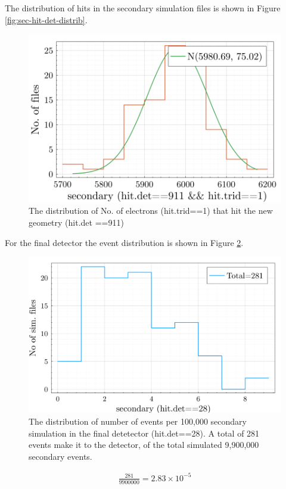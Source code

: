 \documentclass[a4paper,12pt]{article}
\begin{document}
The distribution of hits in the secondary simulation files is shown in Figure \ref{fig:sec-hit-det-distrib}.

\begin{figure}[h!]
    \centering
    \includegraphics[width=1\linewidth]{image/helicoil-20221121-113016-img-secondary-trid-hit-count-hist.png}
    \caption{The distribution of No. of electrons (hit.trid==1) that hit the new geometry (hit.det ==911)}
    \label{fig:sec-hit-911-trid-1}
\end{figure}

For the final detector the event distribution is shown in Figure \ref{fig:sec-hit-28-no-trid}.
\begin{figure}[h!]
    \centering
    \includegraphics[width=0.9\linewidth]{image/helicoil-20221121-113016-secondary-fin-det-hit.png}
    \caption{The distribution of number of events per 100,000 secondary simulation in the final detetector (hit.det==28). A total of 281 events make it to the detector, of the total simulated 9,900,000 secondary events.}
    \label{fig:sec-hit-28-no-trid}
\end{figure}
\begin{align*}
    \frac{281}{9900000} = 2.83 \times 10^{-5}
\end{align*}
\end{document}
